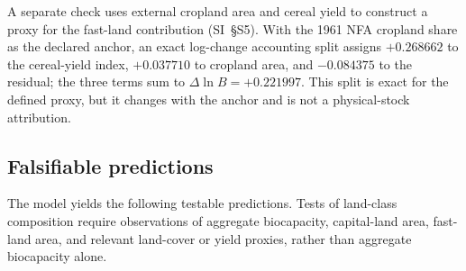 A separate check uses external cropland area and cereal yield to construct a proxy for the fast-land contribution (SI~\S S5). With the 1961 NFA cropland share as the declared anchor, an exact log-change accounting split assigns $+0.268662$ to the cereal-yield index, $+0.037710$ to cropland area, and $-0.084375$ to the residual; the three terms sum to $\Delta\ln B=+0.221997$. This split is exact for the defined proxy, but it changes with the anchor and is not a physical-stock attribution.

\subsection{Falsifiable predictions}\label{sec:predictions}

The model yields the following testable predictions. Tests of land-class composition require observations of aggregate biocapacity, capital-land area, fast-land area, and relevant land-cover or yield proxies, rather than aggregate biocapacity alone.
